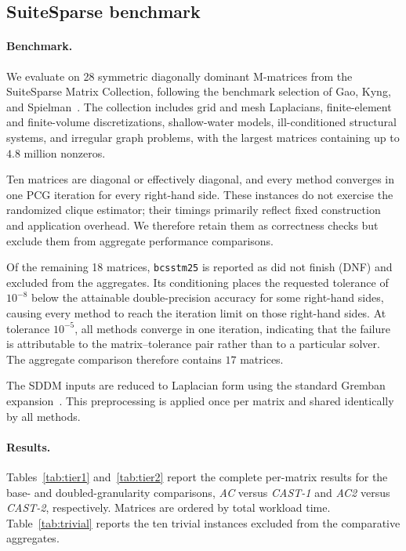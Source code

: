 \documentclass{article}
\newcommand{\CASTone}{\textit{CAST-1}\xspace}
\newcommand{\CASTtwo}{\textit{CAST-2}\xspace}
\newcommand{\AC}{\textit{AC}\xspace}
\newcommand{\ACtwo}{\textit{AC2}\xspace}
\newcommand{\1}{\mathbbm{1}}
\theoremstyle{plain}
\begin{document}
\subsection{SuiteSparse benchmark}\label{sec:suitesparse}

\paragraph{Benchmark.}
We evaluate on 28 symmetric diagonally dominant M-matrices from the
SuiteSparse Matrix Collection, following the benchmark selection of
Gao, Kyng, and Spielman~\cite{AC}. The collection includes grid and
mesh Laplacians, finite-element and finite-volume discretizations,
shallow-water models, ill-conditioned structural systems, and
irregular graph problems, with the largest matrices containing up to
$4.8$ million nonzeros.

Ten matrices are diagonal or effectively diagonal, and every method
converges in one PCG iteration for every right-hand side. These
instances do not exercise the randomized clique estimator; their
timings primarily reflect fixed construction and application
overhead. We therefore retain them as correctness checks but exclude
them from aggregate performance comparisons.

Of the remaining 18 matrices, \texttt{bcsstm25} is reported as did
not finish (DNF) and excluded from the aggregates. Its conditioning
places the requested tolerance of $10^{-8}$ below the attainable
double-precision accuracy for some right-hand sides, causing every
method to reach the iteration limit on those right-hand sides. At
tolerance $10^{-5}$, all methods converge in one iteration,
indicating that the failure is attributable to the matrix--tolerance
pair rather than to a particular solver. The aggregate comparison
therefore contains $17$ matrices.

The SDDM inputs are reduced to Laplacian form using the standard
Gremban expansion~\cite{gremban1996combinatorial}. This preprocessing
is applied once per matrix and shared identically by all methods. 

\paragraph{Results.}

Tables~\ref{tab:tier1} and~\ref{tab:tier2} report the complete
per-matrix results for the base- and doubled-granularity comparisons,
\AC versus \CASTone and \ACtwo versus \CASTtwo, respectively.
Matrices are ordered by total workload time. Table~\ref{tab:trivial}
reports the ten trivial instances excluded from the
comparative aggregates.
\end{document}
